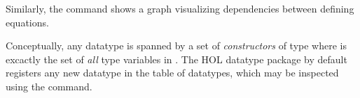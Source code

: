 \begin{isabellebody}
\begin{isamarkuptext}
  Similarly, the \isa{{\isasymCODEDEPS}} command shows a graph
  visualizing dependencies between defining equations.%
\end{isamarkuptext}%
\isamarkuptrue%
%
\isamarkuptrue%
%
\begin{isamarkuptext}%
Conceptually, any datatype is spanned by a set of
  \emph{constructors} of type 
  where  is excactly the set of \emph{all}
  type variables in \isa{{\isasymtau}}.  The HOL datatype package
  by default registers any new datatype in the table
  of datatypes, which may be inspected using
  the \isa{{\isasymPRINTCODESETUP}} command.


\end{isamarkuptext}
\end{isabellebody}
